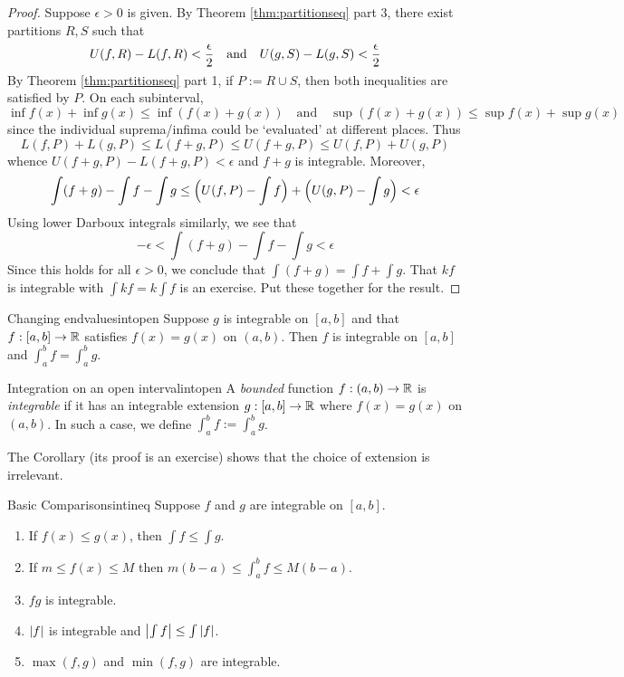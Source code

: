 \begin{proof}
	Suppose $\epsilon>0$ is given. By Theorem \ref{thm:partitionseq} part 3, there exist partitions $R,S$ such that
	\[U(f,R)-L(f,R)<\smash{\frac\epsilon 2}\quad\text{and}\quad U(g,S)-L(g,S)<\smash{\frac\epsilon 2}\]
	By Theorem \ref{thm:partitionseq} part 1, if $P:=R\cup S$, then both inequalities are satisfied by $P$. On each subinterval,
	\[\inf f(x)+\inf g(x)\le \inf(f(x)+g(x))\quad\text{and}\quad \sup(f(x)+g(x))\le\sup f(x)+\sup g(x)\]
	since the individual suprema/infima could be `evaluated' at different places. Thus
	\[L(f,P)+L(g,P)\le L(f+g,P)\le U(f+g,P)\le U(f,P)+U(g,P)\]
	whence $U(f+g,P)-L(f+g,P)<\epsilon$ and $f+g$ is integrable. Moreover,
	\begin{gather*}
	\int(f+g)-\int f-\int g \le \Bigl(U(f,P)-\int f\Bigr)+\Bigl(U(g,P)-\int g\Bigr)<\epsilon
	\end{gather*}
	Using lower Darboux integrals similarly, we see that
	\[-\epsilon<\int(f+g)-\int f-\int g<\epsilon\]
	Since this holds for all $\epsilon>0$, we conclude that $\int(f+g)=\int f+\int g$.\smallbreak
	That $kf$ is integrable with $\int kf=k\int f$ is an exercise. Put these together for the result.
\end{proof}

\begin{cor}{Changing endvalues}{intopen}
Suppose $g$ is integrable on $[a,b]$ and that $f:[a,b]\to\mathbb{R}$ satisfies $f(x)=g(x)$ on $(a,b)$. Then $f$ is integrable on $[a,b]$ and $\int_a^b f=\int_a^b g$.
\end{cor}

\begin{defn}{Integration on an open interval}{intopen}
A \emph{bounded} function $f:(a,b)\to\mathbb{R}$ is \emph{integrable} if it has an integrable extension $g:[a,b]\to\mathbb{R}$ where $f(x)=g(x)$ on $(a,b)$.
In such a case, we define $\int_a^bf:=\int_a^bg$.
\end{defn}

The Corollary (its proof is an exercise) shows that the choice of extension is irrelevant.


\goodbreak


\begin{thm}{Basic Comparisons}{intineq}
Suppose $f$ and $g$ are integrable on $[a,b]$.
\begin{enumerate}\itemsep1pt\parsep=1pt
  \item If $f(x)\le g(x)$, then $\int f\le\int g$.
  \item If $m\le f(x)\le M$ then $m(b-a)\le\int_a^bf\le M(b-a)$.
  \item $fg$ is integrable.
  \item $\left| f\right|$ is integrable and $\left| \int f\right|\le\int \left| f\right|$.
  \item $\max(f,g)$ and $\min(f,g)$ are integrable.
\end{enumerate}
\end{thm}

